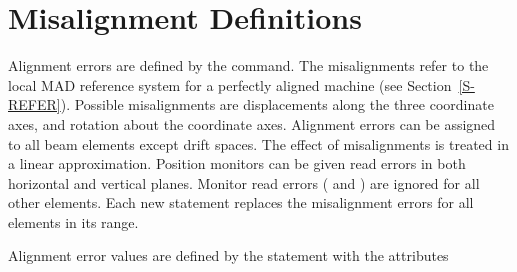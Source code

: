 \section{Misalignment Definitions}
\label{S-MISDEF}
Alignment errors are defined by the  command.
The misalignments refer to the local MAD reference system
for a perfectly aligned machine (see Section~\ref{S-REFER}).
Possible misalignments are displacements
along the three coordinate axes,
and rotation about the coordinate axes.
Alignment errors can be assigned to all beam elements except drift
spaces.
The effect of misalignments is treated in a linear approximation.
Position monitors
can be given read errors in both horizontal and vertical planes.
Monitor read errors ( and )
are ignored for all other elements.
Each new  statement replaces the misalignment errors
for all elements in its range.
\par Alignment error values are defined by the statement
with the attributes
